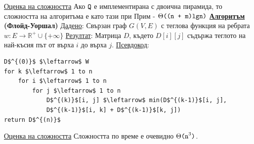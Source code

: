 \documentclass{article}
\begin{document}
\underline{Оценка на сложността} \newline\newline
Ако $\textnormal{\textcolor{black}{\texttt{Q}}}$ е имплементирана с двоична пирамида, то сложността на алгоритъма е като тази при Прим - $\Theta\textnormal{\textcolor{black}{\texttt{((n + m)lgn)}}}$ \newline\newline
\textbf{\underline{Алгоритъм} (Флойд-Уоршал)} \newline\newline
\underline{Дадено}: Свързан граф $G(V, E)$ с теглова функция на ребрата $w : E \rightarrow \mathbb{R}^+ \cup \{+\infty\}$ \newline
\underline{Резултат}: Матрица $D$, където $D[i][j]$ съдържа теглото на най-късия път от върха $i$ до върха $j$. \newline
\underline{Псевдокод}:
\begin{lstlisting}[style=CStyle]
D$^{(0)}$ $\leftarrow$ W
for k $\leftarrow$ 1 to n
    for i $\leftarrow$ 1 to n
        for j $\leftarrow$ 1 to n
            D$^{(k)}$[i, j] $\leftarrow$ min(D$^{(k-1)}$[i, j],
            D$^{(k-1)}$[i, k] + D$^{(k-1)}$[k, j])
return D$^{(n)}$
\end{lstlisting}
\underline{Оценка на сложността} \newline\newline
Сложността по време е очевидно $\Theta\textnormal{\textcolor{black}{\texttt{(n}}}^3\textnormal{\textcolor{black}{\texttt{)}}}$.
\end{document}
